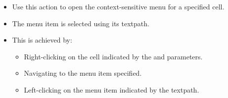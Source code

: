 
\begin{itemize}
\item Use this action to open the context-sensitive menu for a specified cell.
\item The menu item is selected using its textpath. 
\item This is achieved by:
\begin{itemize}
\item Right-clicking on the cell indicated by the  and
   parameters.
\item Navigating to the menu item specified.
\item Left-clicking on the menu item indicated by the textpath.  
\end{itemize}
 \end{itemize}
 